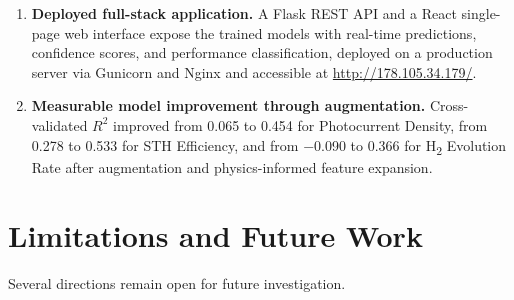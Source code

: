 \begin{enumerate}
  \item \textbf{Deployed full-stack application.}
        A Flask REST API and a React single-page web interface expose the
        trained models with real-time predictions, confidence scores,
        and performance classification, deployed on a production server
        via Gunicorn and Nginx and accessible at \url{http://178.105.34.179/}.

  \item \textbf{Measurable model improvement through augmentation.}
        Cross-validated $R^2$ improved from 0.065 to 0.454 for Photocurrent
        Density, from 0.278 to 0.533 for STH Efficiency, and from $-$0.090
        to 0.366 for H\textsubscript{2} Evolution Rate after augmentation
        and physics-informed feature expansion.
\end{enumerate}

\section{Limitations and Future Work}

Several directions remain open for future investigation.

